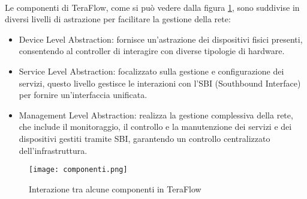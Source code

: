 \\Le componenti di TeraFlow, come si può vedere dalla figura \ref{fig:componenti}, sono suddivise in diversi livelli di astrazione per facilitare la gestione della rete:
\begin{itemize}
\item Device Level Abstraction: fornisce un'astrazione dei dispositivi fisici presenti, consentendo al controller di interagire con diverse tipologie di hardware.
\item Service Level Abstraction: focalizzato sulla gestione e configurazione dei servizi, questo livello gestisce le interazioni con l'SBI (Southbound Interface) per fornire un'interfaccia unificata.
\item Management Level Abstraction: realizza la gestione complessiva della rete, che include il monitoraggio, il controllo e la manutenzione dei servizi e dei dispositivi gestiti tramite SBI, garantendo un controllo centralizzato dell'infrastruttura.
\end{itemize}
\begin{figure}[h]
    \centering
   \texttt{[image: componenti.png]}
    \caption{Interazione tra alcune componenti in TeraFlow}
    \label{fig:componenti}
\end{figure}



